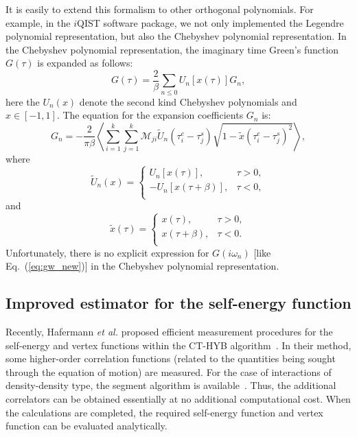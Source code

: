 It is easily to extend this formalism to other orthogonal polynomials. For example, in the $i$QIST software package, we not only implemented the Legendre polynomial representation, but also the Chebyshev polynomial representation. In the Chebyshev polynomial representation, the imaginary time Green's function $G(\tau)$ is expanded as follows:
\begin{equation}
G(\tau) = \frac{2}{\beta} \sum_{n \leq 0} U_n [x({\tau})]G_{n},
\end{equation}
here the $U_n(x)$ denote the second kind Chebyshev polynomials and $x \in [-1,1]$. The equation for the expansion coefficients $G_n$ is:
\begin{equation}
G_n = -\frac{2}{\pi\beta} \left\langle  \sum^{k}_{i=1} \sum^{k}_{j=1} 
\mathcal{M}_{ji} 
\tilde{U}_{n}(\tau^e_i - \tau^s_j)
\sqrt{1 - \tilde{x}(\tau^e_i - \tau^s_j)^2}
\right\rangle,
\end{equation}
where
\begin{equation}
\tilde{U}_n (x) = 
\begin{cases}
U_n[x(\tau)], & \tau > 0, \\
-U_n[x(\tau+\beta)], & \tau < 0, \\
\end{cases}
\end{equation}
and
\begin{equation}
\tilde{x}(\tau) = 
\begin{cases}
x(\tau), & \tau > 0, \\
x(\tau + \beta), & \tau < 0. \\
\end{cases}
\end{equation}
Unfortunately, there is no explicit expression for $G(i\omega_n)$ [like Eq.~(\ref{eq:gw_new})] in the Chebyshev polynomial representation.

\subsection{Improved estimator for the self-energy function\label{subsec:self}}
Recently, Hafermann \emph{et al.} proposed efficient measurement procedures for the self-energy and vertex functions within the CT-HYB algorithm~\cite{PhysRevB.85.205106,PhysRevB.89.235128}. In their method, some higher-order correlation functions (related to the quantities being sought through the equation of motion) are measured. For the case of interactions of density-density type, the segment algorithm is available~\cite{PhysRevLett.97.076405}. Thus, the additional correlators can be obtained essentially at no additional computational cost. When the calculations are completed, the required self-energy function and vertex function can be evaluated analytically.

